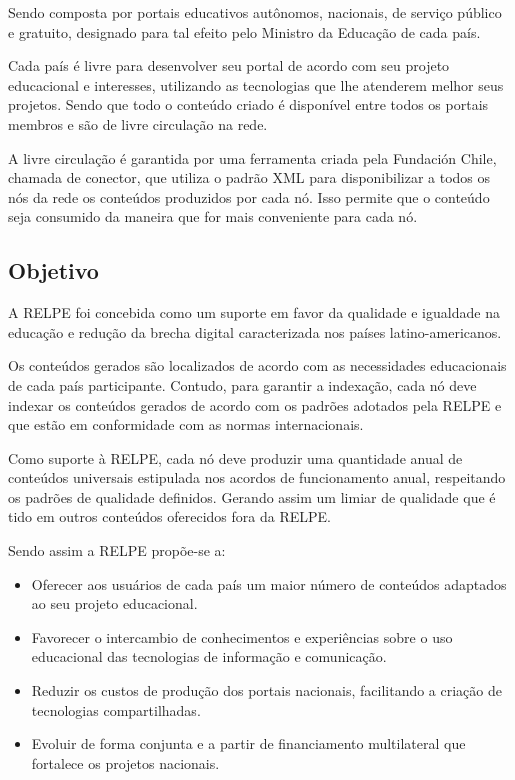 \documentclass[a4paper,12pt]{report}
\begin{document}
        Sendo composta por portais educativos autônomos, nacionais, de serviço
        público e gratuito, designado para tal efeito pelo Ministro da Educação
        de cada país.

        Cada país é livre para desenvolver seu portal de acordo com seu projeto
        educacional e interesses, utilizando as tecnologias que lhe atenderem
        melhor seus projetos. Sendo que todo o conteúdo criado é disponível
        entre todos os portais membros e são de livre circulação na rede.

        A livre circulação é garantida por uma ferramenta criada pela Fundación
        Chile, chamada de conector, que utiliza o padrão XML para disponibilizar
        a todos os nós da rede os conteúdos produzidos por cada nó. Isso permite
        que o conteúdo seja consumido da maneira que for mais conveniente para
        cada nó.

            \subsection{Objetivo}
            A RELPE foi concebida como um suporte em favor da qualidade e
            igualdade na educação e redução da brecha digital caracterizada nos
            países latino-americanos.

            Os conteúdos gerados são localizados de acordo com as necessidades
            educacionais de cada país participante. Contudo, para garantir a
            indexação, cada nó deve indexar os conteúdos gerados de acordo com
            os padrões adotados pela RELPE e que estão em conformidade com as
            normas internacionais.

            Como suporte à RELPE, cada nó deve produzir uma quantidade anual de
            conteúdos universais estipulada nos acordos de funcionamento anual,
            respeitando os padrões de qualidade definidos. Gerando assim um
            limiar de qualidade que é tido em outros conteúdos oferecidos fora
            da RELPE.

            Sendo assim a RELPE propõe-se a:

            \begin{itemize}

                \item Oferecer aos usuários de cada país um maior número de
                conteúdos adaptados ao seu projeto educacional.

                \item Favorecer o intercambio de conhecimentos e experiências
                sobre o uso educacional das tecnologias de informação e
                comunicação.

                \item Reduzir os custos de produção dos portais nacionais,
                facilitando a criação de tecnologias compartilhadas.

                \item Evoluir de forma conjunta e a partir de financiamento
                multilateral que fortalece os projetos nacionais.

            \end{itemize}
\end{document}
